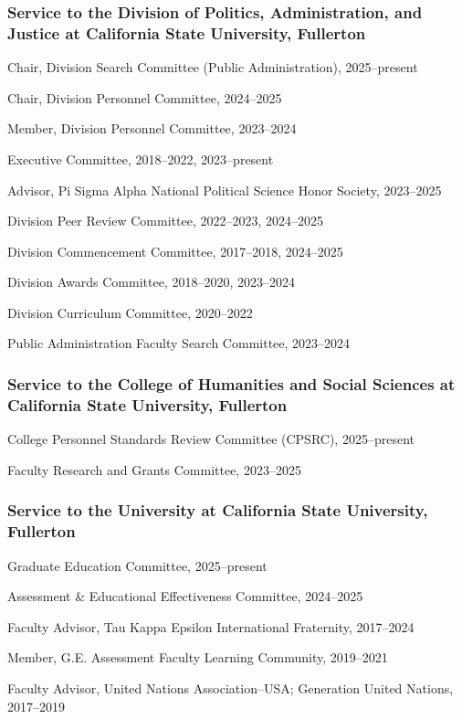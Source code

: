 \documentclass[12pt,letterpaper]{article}
\renewenvironment{itemize}{
  \begin{list}{}{
    \setlength{\leftmargin}{1.5em}
    \setlength{\itemsep}{0.25em}
    \setlength{\parskip}{0pt}
    \setlength{\parsep}{0.25em}
  }
}{
  \end{list}
}
\begin{document}
\subsubsection*{Service to the Division of Politics, Administration, and Justice at California State University, Fullerton}
\begin{itemize}\leftmargin=2pt\itemindent=-15pt
    \item Chair, Division Search Committee (Public Administration), 2025--present
    \item Chair, Division Personnel Committee, 2024--2025
    \item Member, Division Personnel Committee, 2023--2024
    \item Executive Committee, 2018--2022, 2023--present
    \item Advisor, Pi Sigma Alpha National Political Science Honor Society, 2023--2025
    \item Division Peer Review Committee, 2022--2023, 2024--2025
    \item Division Commencement Committee, 2017--2018, 2024--2025
    \item Division Awards Committee, 2018--2020, 2023--2024
    \item Division Curriculum Committee, 2020--2022
    \item Public Administration Faculty Search Committee, 2023--2024
\end{itemize}

\subsubsection*{Service to the College of Humanities and Social Sciences at California State University, Fullerton}
\begin{itemize}\leftmargin=2pt\itemindent=-15pt
    \item College Personnel Standards Review Committee (CPSRC), 2025--present
    \item Faculty Research and Grants Committee, 2023--2025
\end{itemize}

\subsubsection*{Service to the University at California State University, Fullerton}
\begin{itemize}\leftmargin=2pt\itemindent=-15pt
    \item Graduate Education Committee, 2025--present
    \item Assessment \& Educational Effectiveness Committee, 2024--2025
    \item Faculty Advisor, Tau Kappa Epsilon International Fraternity, 2017--2024
    \item Member, G.E. Assessment Faculty Learning Community, 2019--2021
    \item Faculty Advisor, United Nations Association--USA; Generation United Nations, 2017--2019
\end{itemize}
\end{document}
